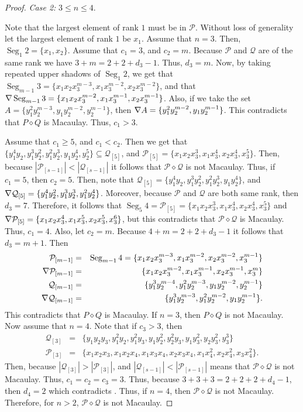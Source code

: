 \documentclass[10pt,a4paper]{amsart}
\renewcommand{\P}{{\mathcal P}}
\newcommand{\Q}{{\mathcal Q}}
\def\Seg{\operatorname{Seg}}
\newcommand{\uSdw}{\rotatebox[origin=c]{180}{$\Delta$}}
\begin{document}
\begin{proof}
\emph{Case 2:} $3 \leq n\leq 4$.

Note that the largest element of rank $1$ must be in $\P$. Without loss of generality let the largest element of rank $1$ be $x_1$. Assume that $n = 3$. Then, $\Seg_1 2 = \{x_1,x_2\}$. Assume that $c_1 = 3$, and $c_2 = m$. Because $\P$ and $\Q$ are of the same rank we have $3 + m = 2 + 2 + d_3 - 1$. Thus, $d_3 = m$. Now, by taking repeated upper shadows of $\Seg_1 2$, we get that $\Seg_{m-1} 3 = \{x_1x_2x_3^{m-3},x_1x_3^{m-2},x_2x_3^{m-2}\}$, and that $\uSdw \Seg_{m-1} 3 = \{x_1x_2x_3^{m-2},x_1x_3^{m-1},x_2x_3^{m-1}\}$. Also, if we take the set $A = \{y_1^2y_2^{m-3},y_1y_2^{m-2},y_2^{m-1}\}$, then $\uSdw A = \{y_1^2y_2^{m-2},y_1y_2^{m-1}\}$. This contradicts that $P \diamond Q$ is Macaulay. Thus, $c_1 > 3$. 
 
 Assume that $c_1 \geq 5$, and $c_1 < c_2$. Then we get that $\{y_1^4y_2,y_1^3y_2^2,y_1^2y_2^3,y_1y_2^4,y_2^5\} \subseteq \Q_{[5]}$, and  $\P_{[5]} = \{x_1x_2x_3^3,x_1x_3^4,x_2x_3^4,x_3^5\}$. Then, because $|\P_{[s-1]}| < |\Q_{[s-1]}|$ it follows that $\P \diamond \Q$ is not Macaulay. Thus, if $c_1 = 5$, then $c_2 = 5$. Then, note that $\Q_{[5]} = \{y_1^4y_2,y_1^3y_2^2,y_1^2y_2^3,y_1y_2^4\}$, and $\uSdw \Q_{[5]} = \{y_1^4y_2^2,y_1^3y_2^3,y_1^2y_2^4\}$. Moreover, because $\P$ and $\Q$ are both same rank, then $d_3 = 7$. Therefore, it follows that $\Seg_5 4 = \P_{[5]} = \{x_1x_2x_3^3,x_1x_3^4,x_2x_3^4,x_3^5\}$ and $\uSdw \P_{[5]} = \{x_1x_2x_3^4, x_1x_3^5, x_2x_3^5, x_3^6\}$, but this contradicts that $\P \diamond \Q$ is Macaulay. Thus, $c_1 = 4$. Also, let $c_2 = m$. Because $4 + m = 2 + 2 + d_3 - 1$ it follows that $d_3 = m+1$. Then
 \begin{eqnarray*}
 \P_{[m-1]} &=& \Seg_{m-1} 4 = \{x_1x_2x_3^{m-3},x_1x_3^{m-2},x_2x_3^{m-2},x_3^{m-1}\}\\
 \uSdw \P_{[m-1]} &=&\{x_1x_2x_3^{m-2},x_1x_3^{m-1},x_2x_3^{m-1},x_3^m\}\\
  \Q_{[m-1]} &=& \{y_1^3y_2^{m-4},y_1^2y_2^{m-3},y_1y_2^{m-2},y_2^{m-1}\}\\
  \uSdw \Q_{[m-1]} &=&\{y_1^3y_2^{m-3},y_1^2y_2^{m-2},y_1y_2^{m-1}\}.
  \end{eqnarray*}
This contradicts that $P \diamond Q$ is Macaulay. If $n = 3$, then $P \diamond Q$ is not Macaulay. Now assume that $n = 4$. Note that if $c_3 > 3$, then 
\begin{eqnarray*}
\Q_{[3]} &=&  \{y_1y_2y_3,y_1^2y_2,y_1^2y_3,y_1y_2^2,y_2^2y_3,y_1y_3^2,y_2y_3^2,y_3^3\}\\
\P_{[3]} &=&  \{x_1x_2x_3,x_1x_2x_4,x_1x_3x_4,x_2x_3x_4,x_1x_4^2,x_2x_4^2,x_3x_4^2\}.
\end{eqnarray*}
Then, because $|\Q_{[3]}| > |\P_{[3]}|$, and $|\Q_{[s-1]}| < |\P_{[s-1]}|$ means that $\P \diamond \Q$ is not Macaulay. Thus, $c_1 = c_2 = c_3 = 3$. Thus, because $3 + 3 + 3 = 2 + 2 + 2 + d_4 - 1$, then $d_4 = 2$ which contradicts . Thus, if $n = 4$, then $\P \diamond \Q$ is not Macaulay. Therefore, for $n > 2$, $\P \diamond \Q$ is not Macaulay.
\end{proof}
\end{document}

